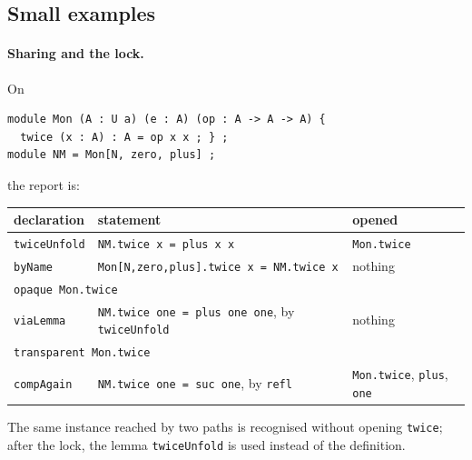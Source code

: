 \documentclass[11pt]{article}
\newcommand{\kw}[1]{\texttt{#1}}
\begin{document}
\subsection{Small examples}

\paragraph{Sharing and the lock.} On
\begin{verbatim}
module Mon (A : U a) (e : A) (op : A -> A -> A) {
  twice (x : A) : A = op x x ; } ;
module NM = Mon[N, zero, plus] ;
\end{verbatim}
the report is:
\begin{center}
\begin{tabular}{lll}
\toprule
declaration & statement & opened\\
\midrule
\kw{twiceUnfold} & \kw{NM.twice x = plus x x} & \kw{Mon.twice}\\
\kw{byName} & \kw{Mon[N,zero,plus].twice x = NM.twice x} & nothing\\
\multicolumn{3}{l}{\kw{opaque Mon.twice}}\\
\kw{viaLemma} & \kw{NM.twice one = plus one one}, by \kw{twiceUnfold} & nothing\\
\multicolumn{3}{l}{\kw{transparent Mon.twice}}\\
\kw{compAgain} & \kw{NM.twice one = suc one}, by \kw{refl} & \kw{Mon.twice}, \kw{plus}, \kw{one}\\
\bottomrule
\end{tabular}
\end{center}
The same instance reached by two paths is recognised without opening
\kw{twice}; after the lock, the lemma \kw{twiceUnfold} is used instead
of the definition.
\end{document}
